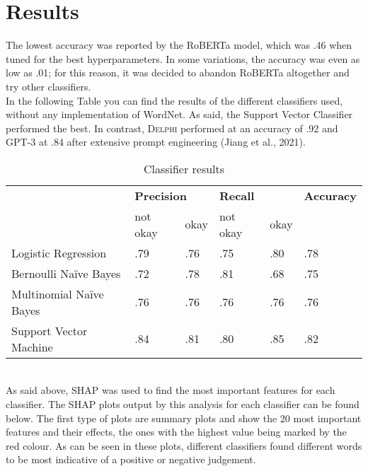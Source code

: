 \documentclass[final]{clv3} %
\begin{document}
\section{Results}

The lowest accuracy was reported by the RoBERTa model, which was .46 when tuned for the best hyperparameters. In some variations, the accuracy was even as low as .01; for this reason, it was decided to abandon RoBERTa altogether and try other classifiers.\\

In the following Table you can find the results of the different classifiers used, without any implementation of WordNet. As said, the Support Vector Classifier performed the best. In contrast, \textsc{Delphi} performed at an accuracy of .92 and GPT-3 at .84 after extensive prompt engineering (Jiang et al., 2021).

\begin{table}[!hbtp]
\begin{tabular}{l|ll|ll|l|}
\cline{2-6}
                                              & \multicolumn{2}{l|}{\textbf{Precision}}       & \multicolumn{2}{l|}{\textbf{Recall}}          & \multirow{}{}{\textbf{Accuracy}} \\ \cline{2-5}
                                              & \multicolumn{1}{l|}{not okay} & okay & \multicolumn{1}{l|}{not okay} & okay &                           \\ \hline
\multicolumn{1}{|l|}{Logistic Regression}     & \multicolumn{1}{l|}{.79}      & .76  & \multicolumn{1}{l|}{.75}      & .80  & .78                       \\ \hline
\multicolumn{1}{|l|}{Bernoulli Naïve Bayes}   & \multicolumn{1}{l|}{.72}      & .78  & \multicolumn{1}{l|}{.81}      & .68  & .75                       \\ \hline
\multicolumn{1}{|l|}{Multinomial Naïve Bayes} & \multicolumn{1}{l|}{.76}      & .76  & \multicolumn{1}{l|}{.76}      & .76  & .76                       \\ \hline
\multicolumn{1}{|l|}{Support Vector Machine}  & \multicolumn{1}{l|}{.84}      & .81  & \multicolumn{1}{l|}{.80}      & .85  & .82                       \\ \hline
\end{tabular}
\caption{Classifier results}
\label{tab:table-1}
\end{table}\\

As said above, SHAP \cite{shap} was used to find the most important features for each classifier. The SHAP plots output by this analysis for each classifier can be found below.  The first type of plots are summary plots and show the 20 most important features and their effects, the ones with the highest value being marked by the red colour. As can be seen in these plots, different classifiers found different words to be most indicative of a positive or negative judgement.\\
\end{document}
